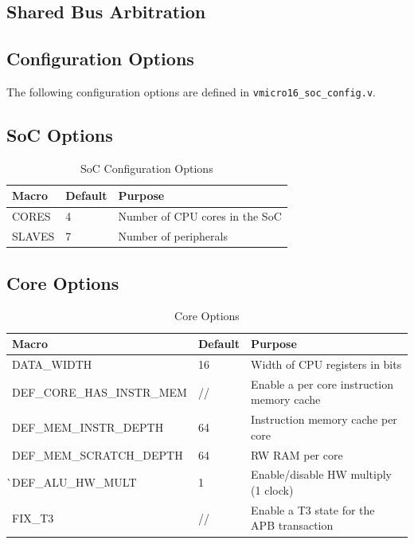 \documentclass[11pt,a4paper]{report}
\begin{document}
{\section{Shared Bus Arbitration}

\newpage
\begin{appendices}

\chapter{Configuration Options}
The following configuration options are defined in \verb|vmicro16_soc_config.v|.
\section{SoC Options}
\begin{table}[H]
\centering
\label{tab:isa}
\begin{tabularx}{\textwidth}{l|l|l}
Macro      & Default & Purpose                         \\ 
\hline
CORES  & 4       & Number of CPU cores in the SoC  \\
SLAVES & 7       & Number of peripherals          
\end{tabularx}
\captionsetup{labelformat=empty}
\caption{SoC Configuration Options}
\end{table}

\section{Core Options}
\begin{table}[H]
\centering
\begin{tabular}{l|l|l}
Macro                      & Default & Purpose                                     \\ 
\hline
DATA\_WIDTH                & 16      & Width of CPU registers in bits              \\
DEF\_CORE\_HAS\_INSTR\_MEM & //      & Enable a per core instruction memory cache  \\
DEF\_MEM\_INSTR\_DEPTH     & 64      & Instruction memory cache per core           \\
DEF\_MEM\_SCRATCH\_DEPTH   & 64      & RW RAM per core                             \\
̀DEF\_ALU\_HW\_MULT        & 1       & Enable/disable HW multiply (1 clock)        \\
FIX\_T3                    & //      & Enable a T3 state for the APB transaction  
\end{tabular}
\captionsetup{labelformat=empty}
\caption{Core Options}
\label{tab:isa}
\end{table}


\end{appendices}}
\end{document}
